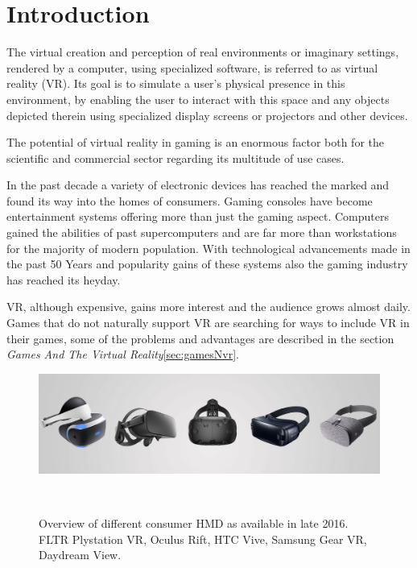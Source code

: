 \section{Introduction}

The virtual creation and perception of real environments or imaginary settings, rendered by a computer, using specialized software, is referred to as virtual reality (VR). Its goal is to simulate a user's physical presence in this environment, by enabling the user to interact with this space and any objects depicted therein using specialized display screens or projectors and other devices.

The potential of virtual reality in gaming is an enormous factor both for the scientific and commercial sector regarding its multitude of use cases. 

In the past decade a variety of electronic devices has reached the marked and found its way into the homes of consumers. Gaming consoles have become entertainment systems offering more than just the gaming aspect. Computers gained the abilities of past supercomputers and are far more than workstations for the majority of modern population. With technological advancements made in the past 50 Years and popularity gains of these systems also the gaming industry has reached its heyday. 

VR, although expensive, gains more interest and the audience grows almost daily. 
Games that do not naturally support VR are searching for ways to include VR in 
their games, some of the problems and advantages are described in the section 
\textit{Games And The Virtual Reality}\ref{sec:gamesNvr}.

\begin{figure}%
	\centering
	\includegraphics[width=0.99\columnwidth]{./figures/vr-hmd}
	\caption[vr-hmd]{Overview of different consumer HMD as available in late 2016. FLTR Plystation VR, Oculus Rift, HTC Vive, Samsung Gear VR, Daydream View.\footnotemark}~\label{fig:vrHMD}
\end{figure}

